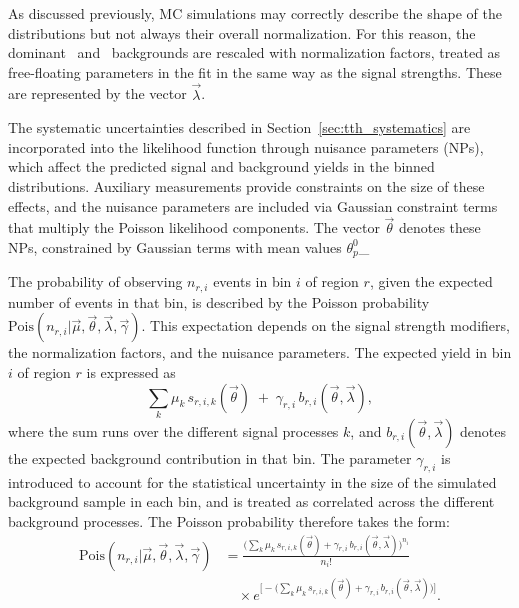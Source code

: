   As discussed previously, MC simulations may correctly describe the shape of the distributions but not always their overall normalization. 
  For this reason, the dominant \ztautau\ and \ttbar\ backgrounds are rescaled with normalization factors, treated as free-floating parameters in the fit in the same way as the signal strengths. 
  These are represented by the vector $\vec{\lambda}$. 
  
  The systematic uncertainties described in Section~\ref{sec:tth_systematics} are incorporated into the likelihood function through nuisance parameters (NPs), 
  which affect the predicted signal and background yields in the binned distributions. 
  Auxiliary measurements provide constraints on the size of these effects, and the nuisance parameters are included via Gaussian constraint terms that multiply the Poisson likelihood components. 
  The vector $\vec{\theta}$ denotes these NPs, constrained by Gaussian terms with mean values $\theta^{0}_{p}$_
  
  The probability of observing $n_{r,i}$ events in bin $i$ of region $r$, 
  given the expected number of events in that bin, is described by the Poisson probability 
  $\text{Pois}(n_{r,i}|\vec{\mu},\vec{\theta},\vec{\lambda},\vec{\gamma})$. 
  This expectation depends on the signal strength modifiers, the normalization factors, and the nuisance parameters. 
  The expected yield in bin $i$ of region $r$ is expressed as
  \begin{equation}
  \sum_{k} \mu_k \, s_{r,i,k}(\vec{\theta}) \;+\; \gamma_{r,i} \, b_{r,i}(\vec{\theta},\vec{\lambda}),
  \end{equation}
  where the sum runs over the different signal processes $k$, 
  and $b_{r,i}(\vec{\theta},\vec{\lambda})$ denotes the expected background contribution in that bin. 
  The parameter $\gamma_{r,i}$ is introduced to account for the statistical uncertainty in the size of the simulated background sample in each bin, 
  and is treated as correlated across the different background processes. 
The Poisson probability therefore takes the form:
\begin{equation}
  \begin{aligned}
  \text{Pois}(n_{r,i}|\vec{\mu},\vec{\theta},\vec{\lambda},\vec{\gamma}) 
  &= \frac{\Big(\sum_{k} \mu_k \, s_{r,i,k}(\vec{\theta}) + \gamma_{r,i} \, b_{r,i}(\vec{\theta},\vec{\lambda}) \Big)^{n_i}}{n_i!} \\
  &\quad \times 
  e^{\!\Big[-\Big(\sum_{k} \mu_k \, s_{r,i,k}(\vec{\theta}) + \gamma_{r,i} \, b_{r,i}(\vec{\theta},\vec{\lambda}) \Big)\Big]}.
  \end{aligned}
  \end{equation}
  

